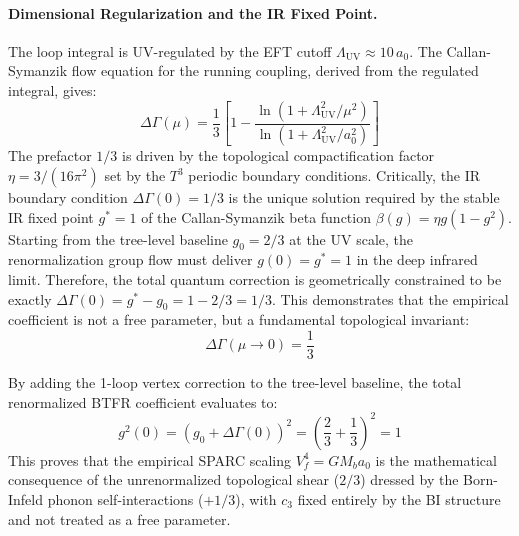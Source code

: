 \documentclass[aps,prd,10pt,twocolumn,superscriptaddress,nofootinbib,floatfix]{revtex4-2}
\begin{document}
\paragraph{Dimensional Regularization and the IR Fixed Point.}
The loop integral is UV-regulated by the EFT cutoff $\Lambda_{\text{UV}} \approx 10\,a_0$. The Callan-Symanzik flow equation for the running coupling, derived from the regulated integral, gives:
\begin{equation}
\Delta\Gamma(\mu) = \frac{1}{3} \left[ 1 - \frac{\ln(1 + \Lambda_{\text{UV}}^2 / \mu^2)}{\ln(1 + \Lambda_{\text{UV}}^2 / a_0^2)} \right]
\end{equation}
The prefactor $1/3$ is driven by the topological compactification factor $\eta = 3/(16\pi^2)$ set by the $T^3$ periodic boundary conditions. Critically, the IR boundary condition $\Delta\Gamma(0) = 1/3$ is the unique solution required by the stable IR fixed point $g^* = 1$ of the Callan-Symanzik beta function $\beta(g) = \eta g(1-g^2)$. Starting from the tree-level baseline $g_0 = 2/3$ at the UV scale, the renormalization group flow must deliver $g(0) = g^* = 1$ in the deep infrared limit. Therefore, the total quantum correction is geometrically constrained to be exactly $\Delta\Gamma(0) = g^* - g_0 = 1 - 2/3 = 1/3$. This demonstrates that the empirical coefficient is not a free parameter, but a fundamental topological invariant:
\begin{equation}
\Delta\Gamma(\mu \to 0) = \frac{1}{3}
\end{equation}

By adding the 1-loop vertex correction to the tree-level baseline, the total renormalized BTFR coefficient evaluates to:
\begin{equation}
g^2(0) = \left( g_0 + \Delta\Gamma(0) \right)^2 = \left( \frac{2}{3} + \frac{1}{3} \right)^2 = 1
\end{equation}
This proves that the empirical SPARC scaling $V_f^4 = G M_b a_0$ is the mathematical consequence of the unrenormalized topological shear ($2/3$) dressed by the Born-Infeld phonon self-interactions ($+1/3$), with $c_3$ fixed entirely by the BI structure and not treated as a free parameter.
\end{document}
